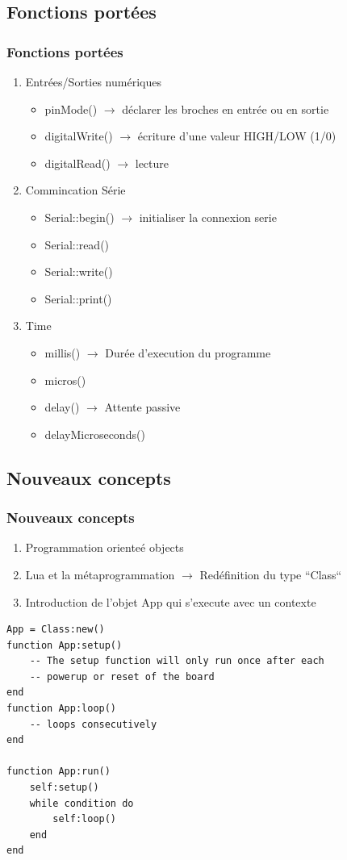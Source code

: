 \documentclass{beamer}
\begin{document}
\subsection{Fonctions portées}
\begin{frame}
\frametitle{Fonctions portées}
\begin{enumerate}
 \item Entrées/Sorties numériques
\begin{itemize}
\item pinMode() $\to$ déclarer les broches en entrée ou en sortie
\item digitalWrite() $\to$ écriture d'une valeur HIGH/LOW (1/0)
\item digitalRead() $\to$ lecture
\end{itemize}
\item Commincation Série
\begin{itemize}
\item Serial::begin() $\to$ initialiser la connexion serie
\item Serial::read()
\item Serial::write()
\item Serial::print()
\end{itemize}
\item Time
\begin{itemize}
\item millis()  $\to$ Durée d'execution du programme
\item micros()
\item delay()  $\to$ Attente passive
\item delayMicroseconds()
\end{itemize}
\end{enumerate}
\end{frame}

\subsection{Nouveaux concepts}
\begin{frame}[containsverbatim]
\frametitle{Nouveaux concepts}
\begin{enumerate}
 \item Programmation orienteé objects
 \item Lua et la métaprogrammation $\to$ Redéfinition du type ``Class``
 \item Introduction de l'objet App qui s'execute avec un contexte
\end{enumerate}

\scriptsize{\begin{lstlisting}
App = Class:new()
function App:setup()
    -- The setup function will only run once after each
    -- powerup or reset of the board
end
function App:loop()
    -- loops consecutively
end

function App:run()
    self:setup()
    while condition do
        self:loop()
    end
end
\end{lstlisting}}

\end{frame}
\end{document}
